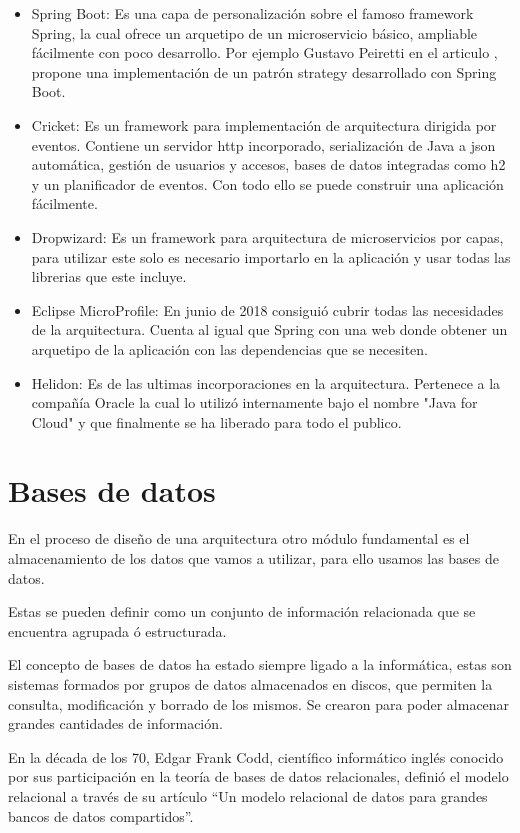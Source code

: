 \documentclass[12pt]{report} %
\begin{document}
 \begin{itemize}
 	\item Spring Boot: Es una capa de personalización sobre el famoso framework Spring, la cual ofrece un arquetipo de un microservicio básico, ampliable fácilmente con poco desarrollo. Por ejemplo Gustavo Peiretti en el articulo \cite{StrategySpringBoot}, propone una implementación de un patrón strategy desarrollado con Spring Boot.
 	\item Cricket: Es un framework para implementación de arquitectura dirigida por eventos. Contiene un servidor http incorporado, serialización de Java a json automática, gestión de usuarios y accesos, bases de datos integradas como h2 y un planificador de eventos. Con todo ello se puede construir una aplicación fácilmente.
 	\item Dropwizard: Es un framework para arquitectura de microservicios por capas, para utilizar este solo es necesario importarlo en la aplicación y usar todas las librerias que este incluye.
 	\item Eclipse MicroProfile: En junio de 2018 consiguió cubrir todas las necesidades de la arquitectura. Cuenta al igual que Spring con una web donde obtener un arquetipo de la aplicación con las dependencias que se necesiten.
 	\item Helidon: Es de las ultimas incorporaciones en la arquitectura. Pertenece a la compañía Oracle la cual lo utilizó internamente bajo el nombre "Java for Cloud" y que finalmente se ha liberado para todo el publico. 
 \end{itemize}
	
	\section{Bases de datos}
	En el proceso de diseño de una arquitectura otro módulo fundamental es el almacenamiento de los datos que vamos a utilizar, para ello usamos las bases de datos.

	Estas se pueden definir como un conjunto de información relacionada que se encuentra agrupada ó estructurada.
	
	El concepto de bases de datos ha estado siempre ligado a la informática, estas son sistemas formados por grupos de datos almacenados en discos, que permiten la consulta, modificación y borrado de los mismos. Se crearon para poder almacenar grandes cantidades de información. 
	
	En la década de los 70, Edgar Frank Codd, científico informático inglés conocido por sus participación en la teoría de bases de datos relacionales, definió el modelo relacional  a través de su artículo “Un modelo relacional de datos para grandes bancos de datos compartidos”\cite{RelationalModel}.
	
\end{document}
